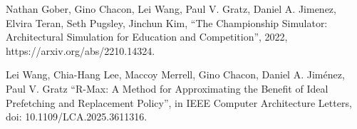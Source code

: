 
\begin{cventries}
\cventry
    {} %
    {} %
    {} %
    {} %
    {
      \begin{cvitems} %
         \item {Nathan Gober, Gino Chacon, Lei Wang, Paul V. Gratz, Daniel A. Jimenez, Elvira Teran, Seth Pugsley, Jinchun Kim, ``The Championship Simulator: Architectural Simulation for Education and Competition'',
    2022, https://arxiv.org/abs/2210.14324.}
         \item {Lei Wang, Chia-Hang Lee, Maccoy Merrell, Gino Chacon, Daniel A. Jiménez, Paul V. Gratz ``R-Max: A Method for Approximating the Benefit of Ideal Prefetching and Replacement Policy'', in IEEE Computer Architecture Letters, doi: 10.1109/LCA.2025.3611316.}        
      \end{cvitems}
    }
\end{cventries}


